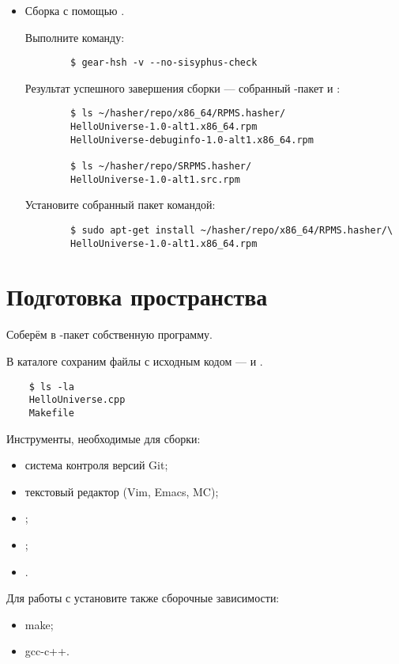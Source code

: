 \begin{itemize}
\item {} Сборка с помощью .
	
	Выполните команду: 
	\begin{verbatim}
		$ gear-hsh -v --no-sisyphus-check 
	\end{verbatim}
	
	Результат успешного завершения сборки --- собранный -пакет и :
	\begin{verbatim}
		$ ls ~/hasher/repo/x86_64/RPMS.hasher/
		HelloUniverse-1.0-alt1.x86_64.rpm
		HelloUniverse-debuginfo-1.0-alt1.x86_64.rpm
		
		$ ls ~/hasher/repo/SRPMS.hasher/
		HelloUniverse-1.0-alt1.src.rpm
	\end{verbatim} 
	
	Установите собранный пакет командой: 
	\begin{verbatim}
		$ sudo apt-get install ~/hasher/repo/x86_64/RPMS.hasher/\
		HelloUniverse-1.0-alt1.x86_64.rpm
	\end{verbatim}
\end{itemize} 


\section{Подготовка пространства}
Соберём в -пакет собственную программу. 

В каталоге  сохраним файлы 
с исходным кодом ---  и .
\begin{verbatim}
	$ ls -la
	HelloUniverse.cpp
	Makefile
\end{verbatim}


Инструменты, необходимые для сборки: 
\begin{itemize}
	\item система контроля версий Git;
	\item текстовый редактор (Vim, Emacs, MC);
	\item {};
	\item {};
	\item {}.
\end{itemize}

Для работы с  установите также сборочные зависимости:
\begin{itemize}
	\item make;
	\item gcc-c++.
\end{itemize} 

